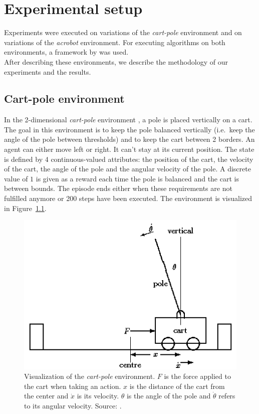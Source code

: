 \chapter{Experimental setup}
Experiments were executed on variations of the \textit{cart-pole} environment and on variations of the \textit{acrobot} environment.
For executing algorithms on both environments, a framework by \cite{Brockman2016OpenAIGym} was used.\\
After describing these environments, we describe the methodology of our experiments and the results.\\

\section{Cart-pole environment} %
\label{sub:cartpole_environment}
In the 2-dimensional \textit{cart-pole} environment \parencite{journals/tsmc/BartoSA83}, a pole is placed vertically on a cart.
The goal in this environment is to keep the pole balanced vertically (i.e.\ keep the angle of the pole between thresholds) and to keep the cart between 2 borders.
An agent can either move left or right. It can't stay at its current position.
The state is defined by 4 continuous-valued attributes: the position of the cart, the velocity of the cart, the angle of the pole and the angular velocity of the pole.
A discrete value of $1$ is given as a reward each time the pole is balanced and the cart is between bounds.
The episode ends either when these requirements are not fulfilled anymore or 200 steps have been executed.
The environment is visualized in Figure~\ref{fig:cartpole}.
\begin{figure}[htb]
    \centering
    \includegraphics[width=.6\linewidth]{images/cartpole.png}
    \caption[Visualization of the \emph{cart-pole} environment]{Visualization of the \emph{cart-pole} environment. $F$ is the force applied to the cart when taking an action. $x$ is the distance of the cart from the center and $\dot{x}$ is its velocity. $\theta$ is the angle of the pole and $\dot{\theta}$ refers to its angular velocity. Source: \cite{grant1990modelling}.}
    \label{fig:cartpole}
\end{figure}

